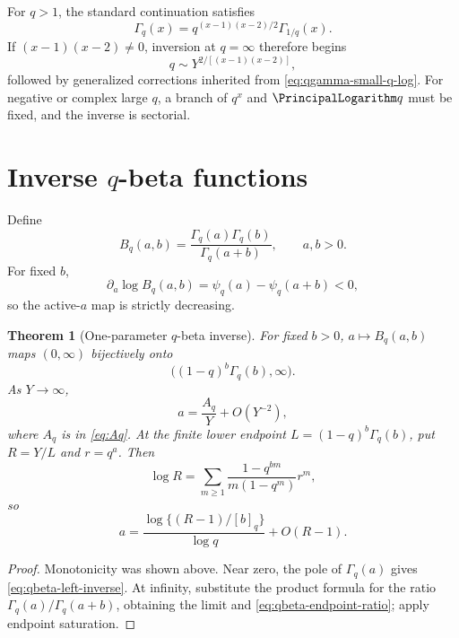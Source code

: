 \documentclass[11pt,a4paper,oneside,openany]{book}
\newtheorem{theorem}{Theorem}[chapter]
\theoremstyle{definition}
\theoremstyle{remark}
\begin{document}
For \(q>1\), the standard continuation satisfies
\begin{equation}\label{eq:qgamma-reciprocity}
 \Gamma_q(x)=q^{(x-1)(x-2)/2}\Gamma_{1/q}(x).
\end{equation}
If \((x-1)(x-2)\ne0\), inversion at \(q=\infty\) therefore begins
\begin{equation}\label{eq:qgamma-qinfty-inverse}
 q\sim Y^{2/[(x-1)(x-2)]},
\end{equation}
followed by generalized corrections inherited from
\eqref{eq:qgamma-small-q-log}.  For negative or complex large \(q\), a
branch of \(q^x\) and \(\PrincipalLogarithm q\) must be fixed, and the inverse is sectorial.

\section{Inverse \texorpdfstring{$q$}{q}-beta functions}

Define
\[
 B_q(a,b)=\frac{\Gamma_q(a)\Gamma_q(b)}{\Gamma_q(a+b)},
 \qquad a,b>0.
\]
For fixed \(b\),
\[
 \partial_a\log B_q(a,b)=\psi_q(a)-\psi_q(a+b)<0,
\]
so the active-\(a\) map is strictly decreasing.

\begin{theorem}[One-parameter \(q\)-beta inverse]\label{thm:qbeta-one-param}
For fixed \(b>0\), \(a\mapsto B_q(a,b)\) maps \((0,\infty)\) bijectively
onto
\begin{equation}\label{eq:qbeta-range}
 \bigl((1-q)^b\Gamma_q(b),\infty\bigr).
\end{equation}
As \(Y\to\infty\),
\begin{equation}\label{eq:qbeta-left-inverse}
 a=\frac{A_q}{Y}+O(Y^{-2}),
\end{equation}
where \(A_q\) is in \eqref{eq:Aq}.  At the finite lower endpoint
\(L=(1-q)^b\Gamma_q(b)\), put \(R=Y/L\) and \(r=q^a\).  Then
\begin{equation}\label{eq:qbeta-endpoint-ratio}
 \log R=\sum_{m\ge1}\frac{1-q^{bm}}{m(1-q^m)}r^m,
\end{equation}
so
\begin{equation}\label{eq:qbeta-endpoint-inverse}
 a=\frac{\log\{(R-1)/[b]_q\}}{\log q}+O(R-1).
\end{equation}
\end{theorem}

\begin{proof}
Monotonicity was shown above.  Near zero, the pole of \(\Gamma_q(a)\) gives
\eqref{eq:qbeta-left-inverse}.  At infinity, substitute the product formula
for the ratio \(\Gamma_q(a)/\Gamma_q(a+b)\), obtaining the limit and
\eqref{eq:qbeta-endpoint-ratio}; apply endpoint saturation.
\end{proof}
\end{document}
